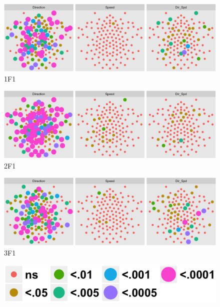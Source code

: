 \documentclass[landscape,final,paperwidth=72in,paperheight=42in,fontscale=0.285]{baposter}
\begin{document}
\begin{poster}
{\begin{figure}[H]
  \caption{1F1}\label{1F1-analyze-and-plot-main-effects-1.png}
  \includegraphics[scale=0.3]{../../figs/1F1-analyze-and-plot-main-effects-1.png}
\end{figure}

\begin{figure}[H]
  \caption{2F1}\label{2F1-analyze-and-plot-main-effects-1.png}
  \includegraphics[scale=0.3]{../../figs/2F1-analyze-and-plot-main-effects-1.png}
\end{figure}

\begin{figure}[H]
    \caption{3F1}\label{3F1-analyze-and-plot-main-effects-1.png}
    \includegraphics[scale=0.3]{../../figs/3F1-analyze-and-plot-main-effects-1.png}
\end{figure}

\begin{figure}[H]
  \includegraphics[scale=0.3]{../../figs/legend-analyze-and-plot-main-effects-1.png}
\end{figure}

}
\end{poster}
\end{document}
